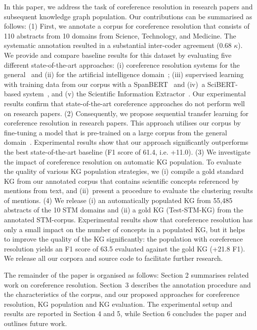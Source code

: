 \documentclass[runningheads]{llncs}
\begin{document}
In this paper, we address the task of coreference resolution in research papers and subsequent knowledge graph population. 
Our contributions can be summarised as follows:
(1) First, we annotate a corpus for coreference resolution that consists of 110 abstracts from 10 domains from Science, Technology, and Medicine. The systematic annotation resulted in a substantial inter-coder agreement (0.68 $\kappa$). We provide and compare baseline results for this dataset by evaluating five different state-of-the-art approaches: (i) coreference resolution systems for the general~\cite{Joshi2020BFCR} and (ii) for the artificial intelligence domain~\cite{Luan2018MultiTaskIO};
(iii) supervised learning with training data from our corpus with a SpanBERT~\cite{Joshi2020SpanBERT} and (iv)~a SciBERT-based system~\cite{Beltagy2019SciBERTPC}, and (v) the Scientific Information Extractor~\cite{Luan2018MultiTaskIO}.
Our experimental results confirm that state-of-the-art coreference approaches do not perform well on research papers.
(2) Consequently, we propose sequential transfer learning for coreference resolution in research papers. This approach utilises our corpus by fine-tuning a model that is pre-trained on a large corpus from the general domain~\cite{Pradhan2013TowardsRL}.
Experimental results show that our approach significantly outperforms the best state-of-the-art baseline (F1 score of 61.4, i.e. +11.0). 
(3) We investigate the impact of coreference resolution on automatic KG population. To evaluate the quality of various KG population strategies, we (i) compile a gold standard KG from our annotated corpus that contains scientific concepts referenced by mentions from text, and (ii)~present a procedure to evaluate the clustering results of mentions.
(4) We release (i) an automatically populated KG from 55,485 abstracts of the 10 STM domains and (ii) a gold KG (Test-STM-KG) from the annotated STM-corpus. 
Experimental results show that coreference resolution has only a small impact on the number of concepts in a populated KG, but it helps to improve the quality of the KG significantly: the population with coreference resolution yields an F1 score of 63.5 evaluated against the gold KG (+21.8 F1).
We release all our corpora and source code to facilitate further research.

The remainder of the paper is organised as follows: Section 2 summarises related work on coreference resolution.
Section~3 describes the annotation procedure and the characteristics of the corpus, and our proposed approaches for coreference resolution, KG population and KG evaluation.
The experimental setup and results are reported in Section 4 and 5, while Section 6 concludes the paper and outlines future work. 
\end{document}
